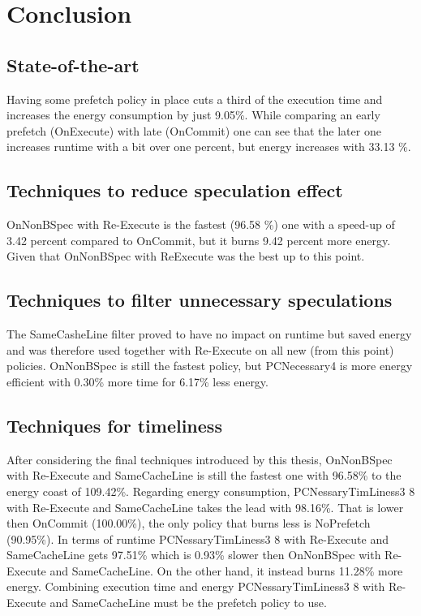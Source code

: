 \chapter{Conclusion}
\label{chap:conclusion}

\section{State-of-the-art} Having some prefetch policy in place cuts a third of the execution time and increases the energy consumption by just 9.05\%. While comparing an early prefetch (OnExecute) with late (OnCommit) one can see that the later one increases runtime with a bit over one percent, but energy increases with 33.13 \%. 

\section{Techniques to reduce speculation effect} OnNonBSpec with Re-Execute is the fastest (96.58 \%) one with a speed-up of 3.42 percent compared to OnCommit, but it burns 9.42 percent more energy. Given that OnNonBSpec with ReExecute was the best up to this point. 

\section{Techniques to filter unnecessary speculations} The SameCasheLine filter proved to have no impact on runtime but saved energy and was therefore used together with Re-Execute on all new (from this point) policies. OnNonBSpec is still the fastest policy, but PCNecessary4 is more energy efficient with 0.30\% more time for 6.17\% less energy.

\section{Techniques for timeliness} After considering the final techniques introduced by this thesis, OnNonBSpec with Re-Execute and SameCacheLine is still the fastest one with 96.58\% to the energy coast of 109.42\%. Regarding energy consumption, PCNessaryTimLiness3 8 with Re-Execute and SameCacheLine takes the lead with 98.16\%. That is lower then OnCommit (100.00\%), the only policy that burns less is NoPrefetch (90.95\%). In terms of runtime PCNessaryTimLiness3 8 with Re-Execute and SameCacheLine gets 97.51\% which is 0.93\% slower then  OnNonBSpec with Re-Execute and SameCacheLine. On the other hand, it instead burns 11.28\% more energy. Combining execution time and energy PCNessaryTimLiness3 8 with Re-Execute and SameCacheLine must be the prefetch policy to use.

